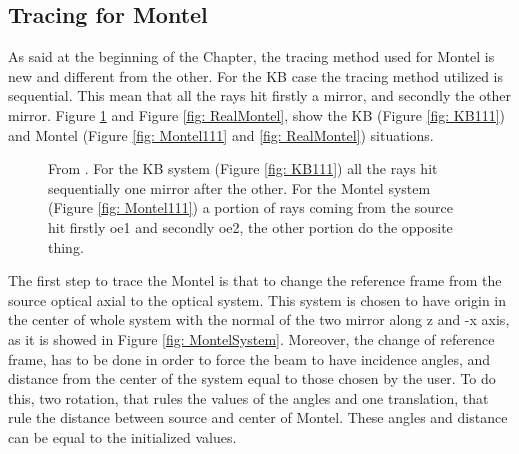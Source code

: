 \subsection{Tracing for Montel}
As said at the beginning of the Chapter, the tracing method used for Montel is new and different from the other. For the KB case the tracing method utilized is sequential. This mean that all the rays hit firstly a mirror, and secondly the other mirror. Figure \ref{fig : 111} and Figure \ref{fig: RealMontel}, show the KB (Figure \ref{fig: KB111}) and Montel (Figure \ref{fig: Montel111} and \ref{fig: RealMontel}) situations.
\begin{figure}[H]
%
\centering
%
\quad
%
%
\caption{From \cite{liu2011achromatic}. For the KB system (Figure \ref{fig: KB111}) all the rays hit sequentially one mirror after the other. For the Montel system (Figure \ref{fig: Montel111}) a portion of rays coming from the source hit firstly oe1 and secondly oe2, the other portion do the opposite thing.}
\label{fig : 111}
%
\end{figure}
\noindent The first step to trace the Montel is that to change the reference frame from the source optical axial to the optical system. This system is chosen to have origin in the center of whole system with the normal of the two mirror along z and -x axis, as it is showed in Figure \ref{fig: MontelSystem}. Moreover, the change of reference frame, has to be done in order to force the beam to have incidence angles, and distance from the center of the system equal to those chosen by the user. To do this, two rotation, that rules the values of the angles and one translation, that rule the distance between source and center of Montel. These angles and distance can be equal to the initialized values.
